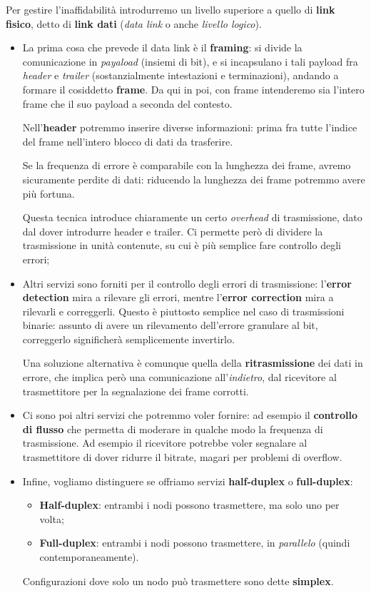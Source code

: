 \documentclass[a4paper,11pt]{article}
\begin{document}
Per gestire l'inaffidabilità introdurremo un livello superiore a quello di \textbf{link fisico}, detto di \textbf{link dati} (\textit{data link} o anche \textit{livello logico}).
\begin{itemize}
	\item La prima cosa che prevede il data link è il \textbf{framing}: si divide la comunicazione in \textit{payaload} (insiemi di bit), e si incapsulano i tali payload fra \textit{header} e \textit{trailer} (sostanzialmente intestazioni e terminazioni), andando a formare il cosiddetto \textbf{frame}. Da qui in poi, con frame intenderemo sia l'intero frame che il suo payload a seconda del contesto. 
		
		Nell'\textbf{header} potremmo inserire diverse informazioni: prima fra tutte l'indice del frame nell'intero blocco di dati da trasferire.
		
		Se la frequenza di errore è comparabile con la lunghezza dei frame, avremo sicuramente perdite di dati: riducendo la lunghezza dei frame potremmo avere più fortuna.

		Questa tecnica introduce chiaramente un certo \textit{overhead} di trasmissione, dato dal dover introdurre header e trailer. Ci permette però di dividere la trasmissione in unità contenute, su cui è più semplice fare controllo degli errori;
	\item Altri servizi sono forniti per il controllo degli errori di trasmissione: l'\textbf{error detection} mira a rilevare gli errori, mentre l'\textbf{error correction} mira a rilevarli e correggerli. Questo è piuttosto semplice nel caso di trasmissioni binarie: assunto di avere un rilevamento dell'errore granulare al bit, correggerlo significherà semplicemente invertirlo.
		
		Una soluzione alternativa è comunque quella della \textbf{ritrasmissione} dei dati in errore, che implica però una comunicazione all'\textit{indietro}, dal ricevitore al trasmettitore per la segnalazione dei frame corrotti.

	\item Ci sono poi altri servizi che potremmo voler fornire: ad esempio il \textbf{controllo di flusso} che permetta di moderare in qualche modo la frequenza di trasmissione. Ad esempio il ricevitore potrebbe voler segnalare al trasmettitore di dover ridurre il bitrate, magari per problemi di overflow.

	\item Infine, vogliamo distinguere se offriamo servizi \textbf{half-duplex} o \textbf{full-duplex}:
		\begin{itemize}
			\item \textbf{Half-duplex}: entrambi i nodi possono trasmettere, ma solo uno per volta;
			\item \textbf{Full-duplex}: entrambi i nodi possono trasmettere, in \textit{parallelo} (quindi contemporaneamente).
		\end{itemize}

		Configurazioni dove solo un nodo può trasmettere sono dette \textbf{simplex}.
\end{itemize}
\end{document}

